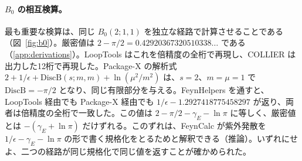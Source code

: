 \documentclass[a4paper,10pt]{ltjsarticle}
\begin{document}
\paragraph{$B_0$ の相互検算。}最も重要な検算は、同じ $B_0(2;1,1)$ を独立な経路で計算させることである（図~\ref{fig:b0}）。厳密値は $2-\pi/2=0.42920367320510338\ldots$ である（\ref{app:derivations}）。LoopTools はこれを倍精度の全桁で再現し、COLLIER は出力した12桁で再現した。Package-X の解析式 $2+1/\epsilon+\mathrm{DiscB}(s;m,m)+\ln(\mu^2/m^2)$ は、$s=2$、$m=\mu=1$ で $\mathrm{DiscB}=-\pi/2$ となり、同じ有限部分を与える。FeynHelpers を通すと、LoopTools 経由でも Package-X 経由でも $1/\epsilon-1.2927418775458297$ が返り、両者は倍精度の全桁で一致した。この値は $2-\pi/2-\gamma_E-\ln\pi$ に等しく、厳密値とは $-(\gamma_E+\ln\pi)$ だけずれる。このずれは、FeynCalc が紫外発散を $1/\epsilon-\gamma_E-\ln\pi$ の形で書く規格化をとるためと解釈できる（推論）。いずれにせよ、二つの経路が同じ規格化で同じ値を返すことが確かめられた。
\end{document}
